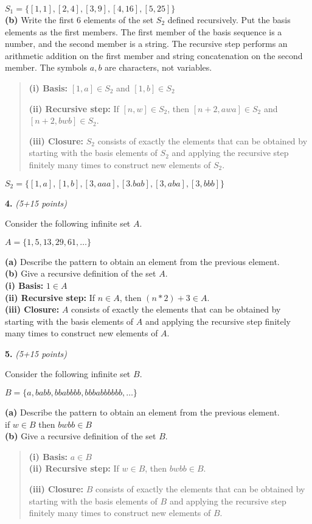 \documentclass[12pt]{article}
\begin{document}
$S_1= \{[1,1],[2,4],[3,9],[4,16],[5,25]\}$\\


{\bf (b) }
Write the first 6 elements of the set $S_2$ defined recursively.
Put the basis elements as the first members.
The first member of the basis sequence is a number, and the second
member is a string. The recursive step performs an arithmetic addition on the 
first member and string concatenation on the second member.
The symbols $a, b$ are characters, not variables.
\begin{quote}
{\bf (i) Basis:} $[1,a] \in S_2$ and $[1,b] \in S_2$

{\bf (ii) Recursive step:} If $[n,w] \in S_2$, then 
$[n+2, awa] \in S_2$ and $[n+2, bwb] \in S_2$.

{\bf (iii) Closure:} $S_2$ consists of exactly the elements that can be
obtained by starting with the basis elements of $S_2$ and applying the
recursive step finitely many times to construct new elements of $S_2$.
\end{quote}

$S_2=\{[1,a],[1,b],[3,aaa],[3.bab],[3,aba],[3,bbb]\}$

\vspace{0.1in}

{\bf 4.} {\em (5+15 points)}

Consider the following infinite set $A$.

$A = \{ 1, 5, 13, 29, 61, \ldots \} $

{\bf (a) }
Describe the pattern to obtain an element from the previous element.\\

{\bf (b) }
 Give a recursive definition of the set $A$.\\
{\bf (i) Basis:} $1 \in A$\\
{\bf (ii) Recursive step:} If $n \in A$, then $(n* 2)+3\in A$.\\
{\bf (iii) Closure:} $A$ consists of exactly the elements that can be
obtained by starting with the basis elements of $A$ and applying the
recursive step finitely many times to construct new elements of $A$.

\vspace{0.1in}

{\bf 5.} {\em (5+15 points)}

Consider the following infinite set $B$.

$B = \{ a, babb, bbabbbb, bbbabbbbbb, \ldots \} $

{\bf (a) }
Describe the pattern to obtain an element from the previous element.\\
if $w \in B$ then $bwbb \in B$\\

{\bf (b) }
 Give a recursive definition of the set $B$.\\
\begin{quote}
{\bf (i) Basis:} $a \in B$\\
{\bf (ii) Recursive step:} If $w\in B$, then $bwbb \in B $.

{\bf (iii) Closure:} $B$ consists of exactly the elements that can be
obtained by starting with the basis elements of $B$ and applying the
recursive step finitely many times to construct new elements of $B$.
\end{quote}
\end{document}
